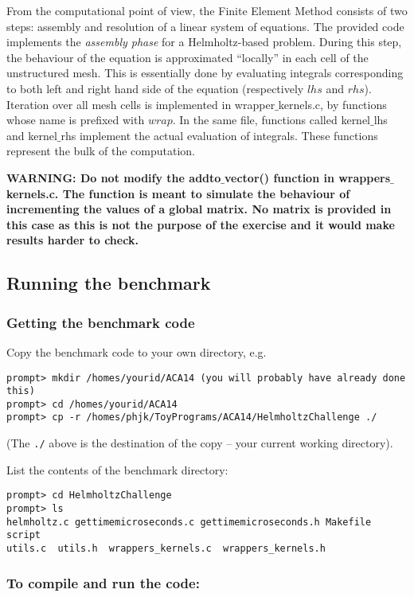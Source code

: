 \documentclass{article}
\begin{document}
From the computational point of view, the Finite Element Method consists of two steps: assembly and resolution of a linear system of equations. The provided code implements the {\em assembly phase} for a Helmholtz-based problem. During this step, the behaviour of the equation is approximated ``locally'' in each cell of the unstructured mesh. This is essentially done by evaluating integrals corresponding to both left and right hand side of the equation (respectively $lhs$ and $rhs$). Iteration over all mesh cells is implemented in wrapper$\_$kernels.c, by functions whose name is prefixed with $wrap$. In the same file, functions called kernel$\_$lhs and kernel$\_$rhs implement the actual evaluation of integrals. These functions represent the bulk of the computation.

\textbf{WARNING: Do not modify the addto$\_$vector() function in wrappers$\_$kernels.c. The function is meant to simulate the behaviour of incrementing the values of a global matrix. No matrix is provided in this case as this is not the purpose of the exercise and it would make results harder to check.}

\subsection*{Running the benchmark}

\subsubsection*{Getting the benchmark code}

Copy the benchmark code to your own directory, e.g.

\begin{verbatim}
prompt> mkdir /homes/yourid/ACA14 (you will probably have already done this)
prompt> cd /homes/yourid/ACA14
prompt> cp -r /homes/phjk/ToyPrograms/ACA14/HelmholtzChallenge ./
\end{verbatim}
(The {\tt ./} above is the destination of the copy -- your current working directory).

List the contents of the benchmark directory:
\begin{verbatim}
prompt> cd HelmholtzChallenge
prompt> ls
helmholtz.c gettimemicroseconds.c gettimemicroseconds.h Makefile script
utils.c  utils.h  wrappers_kernels.c  wrappers_kernels.h
\end{verbatim}

\subsubsection*{To compile and run the code:}
\end{document}

